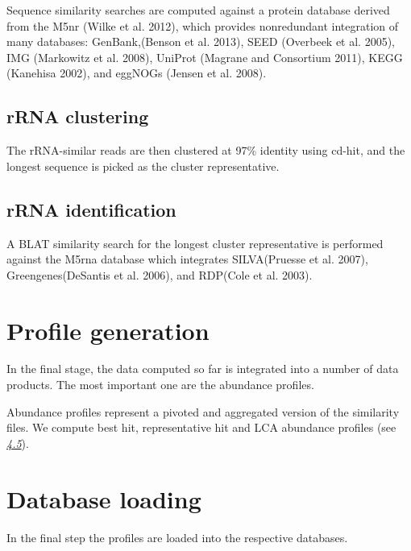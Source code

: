 \documentclass[letterpaper,10pt,english]{sphinxmanual}
\begin{document}
Sequence similarity searches are computed against a protein database
derived from the M5nr (Wilke et al. 2012), which provides nonredundant
integration of many databases: GenBank,(Benson et al. 2013), SEED
(Overbeek et al. 2005), IMG (Markowitz et al. 2008), UniProt (Magrane
and Consortium 2011), KEGG (Kanehisa 2002), and eggNOGs (Jensen et al.
2008).


\subsection{rRNA clustering}
\label{\detokenize{user_manual:rrna-clustering}}
The rRNA-similar reads are then clustered at 97\% identity using cd-hit,
and the longest sequence is picked as the cluster representative.


\subsection{rRNA identification}
\label{\detokenize{user_manual:rrna-identification}}
A BLAT similarity search for the longest cluster representative is
performed against the M5rna database which integrates SILVA(Pruesse et
al. 2007), Greengenes(DeSantis et al. 2006), and RDP(Cole et al. 2003).


\section{Profile generation}
\label{\detokenize{user_manual:profile-generation}}
In the final stage, the data computed so far is integrated into a number
of data products. The most important one are the abundance profiles.

Abundance profiles represent a pivoted and aggregated version of the
similarity files. We compute best hit, representative hit and LCA
abundance profiles (see {\hyperref[\detokenize{user_manual:section:hit-types}]{\emph{4.5}}}).


\section{Database loading}
\label{\detokenize{user_manual:database-loading}}
In the final step the profiles are loaded into the respective databases.
\end{document}
